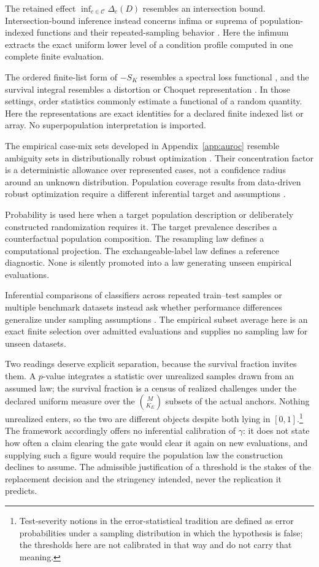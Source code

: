 \documentclass[11pt]{article}
\newcommand{\CSet}{\mathcal{C}}
\theoremstyle{remark}
\begin{document}
The retained effect $\inf_{c\in\CSet}\Delta_c(D)$ resembles an intersection
bound. Intersection-bound inference instead concerns infima or suprema of
population-indexed functions and their repeated-sampling behavior
\cite{chernozhukov2013intersection}. Here the infimum extracts the exact uniform
lower level of a condition profile computed in one complete finite evaluation.

The ordered finite-list form of $-S_K$ resembles a spectral loss functional
\cite{acerbi2002spectral}, and the survival integral resembles a distortion or
Choquet representation \cite{wang1996premium}. In those settings, order
statistics commonly estimate a functional of a random quantity. Here the
representations are exact identities for a declared finite indexed list or
array. No superpopulation interpretation is imported.

The empirical case-mix sets developed in Appendix~\ref{app:auroc} resemble
ambiguity sets in distributionally robust optimization
\cite{shapiro2017distributionally,bental2013robust}. Their concentration factor
is a deterministic allowance over represented cases, not a confidence radius
around an unknown distribution. Population coverage results from data-driven
robust optimization require a different inferential target and assumptions
\cite{duchi2021statistics}.

Probability is used here when a target population description or deliberately
constructed randomization requires it. The target prevalence describes a
counterfactual population composition. The resampling law defines a
computational projection. The exchangeable-label law defines a reference
diagnostic. None is silently promoted into a law generating unseen empirical
evaluations.

Inferential comparisons of classifiers across repeated train--test samples or
multiple benchmark datasets instead ask whether performance differences
generalize under sampling assumptions
\cite{nadeau2003inference,bouckaert2004estimating,demsar2006statistical}. The
empirical subset average here is an exact finite selection over admitted
evaluations and supplies no sampling law for unseen datasets.

Two readings deserve explicit separation, because the survival fraction invites
them. A $p$-value integrates a statistic over unrealized samples drawn from an
assumed law; the survival fraction is a census of realized challenges under the
declared uniform measure over the $\binom{M}{K_E}$ subsets of the actual
anchors. Nothing unrealized enters, so the two are different objects despite
both lying in $[0,1]$.\footnote{Test-severity notions in the error-statistical
tradition are defined as error probabilities under a sampling distribution in
which the hypothesis is false; the thresholds here are not calibrated in that
way and do not carry that meaning.} The framework accordingly offers no
inferential calibration of $\gamma$: it does not state how often a claim
clearing the gate would clear it again on new evaluations, and supplying such a
figure would require the population law the construction declines to assume. The
admissible justification of a threshold is the stakes of the replacement
decision and the stringency intended, never the replication it predicts.
\end{document}
